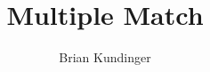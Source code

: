 \documentclass[12pt,letterpaper]{article}
\title{Multiple Match}
\author{Brian Kundinger}
\newcommand{\1}[1]{\mathbb{I}\!\left[#1\right]} %
\def\spacingset#1{\renewcommand{\baselinestretch}%
  {#1}\small\normalsize} \spacingset{1}
\begin{document}
%
%
\spacingset{1.5}


\end{document}
